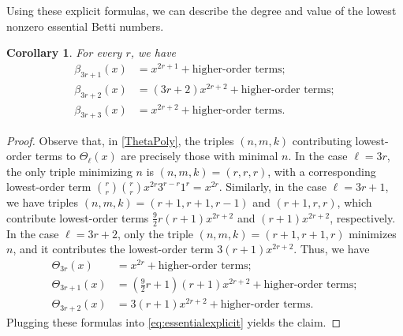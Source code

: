 \documentclass[12pt]{amsart}
\newtheorem{cor}[theorem]{Corollary}
\theoremstyle{definition}
\begin{document}
Using these explicit formulas, we can describe the degree and value of the lowest nonzero essential Betti numbers.
\begin{cor}\label{ordvancor}
   For every $r$, we have
   \begin{align*}
      \beta_{3r+1}(x) &= x^{2r+1} + \text{higher-order terms}; \\
      \beta_{3r+2}(x) &= (3r+2)x^{2r+2} + \text{higher-order terms}; \\
      \beta_{3r+3}(x) &= x^{2r+2}+ \text{higher-order terms}.
   \end{align*}
\end{cor}
\begin{proof}
    Observe that, in \eqref{ThetaPoly}, the triples $(n,m,k)$ contributing lowest-order terms to $\Theta_\ell(x)$ are precisely those with minimal $n$. In the case $\ell=3r$, the only triple minimizing $n$ is $(n,m,k)=(r,r,r)$, with a corresponding lowest-order term
    $\binom{r}{r}\binom{r}{r}x^{2r}3^{r-r}1^r=x^{2r}.$
    Similarly, in the case $\ell=3r+1$, we have triples $(n,m,k)=(r+1,r+1,r-1)$ and $(r+1,r,r)$, which contribute lowest-order terms $\frac{9}{2}r(r+1)x^{2r+2}$ and $(r+1)x^{2r+2}$, respectively. In the case $\ell=3r+2$, only the triple $(n,m,k)=(r+1,r+1,r)$ minimizes $n$, and it contributes the lowest-order term $3(r+1)x^{2r+2}$. Thus, we have
    \begin{align*}
        \Theta_{3r}(x) &= x^{2r} + \text{higher-order terms}; \\
        \Theta_{3r+1}(x) &= \left(\frac92r+1\right)(r+1)x^{2r+2} + \text{higher-order terms}; \\
        \Theta_{3r+2}(x) &= 3(r+1)x^{2r+2} + \text{higher-order terms}.
    \end{align*}
    Plugging these formulas into \eqref{eq:essentialexplicit} yields the claim.
\end{proof}
\end{document}
